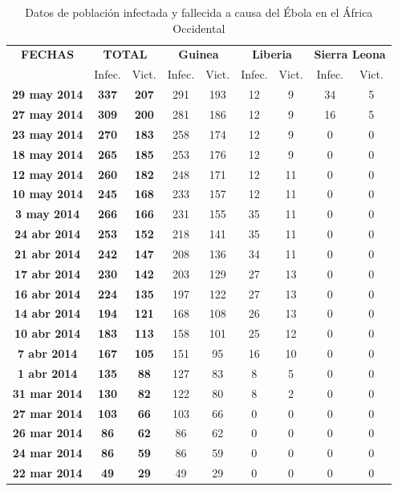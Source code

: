 \documentclass[a4paper,11pt]{article}
\numberwithin{equation}{section}
\begin{document}
\newpage
\begin{table}[H]
\centering
\begin{tabular}{c|cc|cc|cc|cc}
\toprule
\bf FECHAS & \multicolumn{2}{c}{\bf TOTAL}  & \multicolumn{2}{c}{\bf Guinea} & \multicolumn{2}{c}{\bf Liberia} & \multicolumn{2}{c}{\bf Sierra Leona}  \\ 
& Infec. & Vict. & Infec. & Vict. & Infec. & Vict. & Infec. & Vict. \\ \midrule
\bf 29 may 2014			&\bf 337		&\bf 207	&	291	&	193	&	12	&	9	&	34	&	5       \\
\bf 27 may 2014			&\bf 309		&\bf 200	&	281	&	186	&	12	&	9	&	16	&	5       \\
\bf 23 may 2014			&\bf 270		&\bf 183	&	258	&	174	&	12	&	9	&	0	&	0        \\
\bf 18 may 2014			&\bf 265		&\bf 185	&	253	&	176	&	12	&	9	&	0	&	0        \\
\bf 12 may 2014			&\bf 260		&\bf 182	&	248	&	171	&	12	&	11	&	0	&	0       \\
\bf 10 may 2014			&\bf 245		&\bf 168	&	233	&	157	&	12	&	11	&	0	&	0       \\
\bf 3 may 2014			&\bf 266		&\bf 166	&	231	&	155	&	35	&	11	&	0	&	0		\\
\bf 24 abr 2014			&\bf 253		&\bf 152	&	218	&	141	&	35	&	11	&	0	&	0	\\
\bf 21 abr 2014			&\bf 242		&\bf 147	&	208	&	136	&	34	&	11	&	0	&	0	\\
\bf 17 abr 2014			&\bf 230		&\bf 142	&	203	&	129	&	27	&	13	&	0	&	0	\\
\bf 16 abr 2014			&\bf 224		&\bf 135	&	197	&	122	&	27	&	13	&	0	&	0 \\
\bf 14 abr 2014			&\bf 194		&\bf 121	&	168	&	108	&	26	&	13	&	0	&	0 \\
\bf 10 abr 2014			&\bf 183		&\bf 113	&	158	&	101	&	25	&	12	&	0	&	0 \\
\bf 7 abr 2014			&\bf 167		&\bf 105	&	151	&	95	&	16	&	10	&	0	&	0   \\
\bf 1 abr 2014			&\bf 135		&\bf 88		&	127	&	83	&	8	&	5	&	0	&	0      \\
\bf 31 mar 2014			&\bf 130		&\bf 82		&	122	&	80	&	8	&	2	&	0	&	0     \\
\bf 27 mar 2014			&\bf 103		&\bf 66		&	103	&	66	&	0	&	0	&	0	&	0     \\
\bf 26 mar 2014			&\bf 86			&\bf 62		&	86	&	62	&	0	&	0	&	0	&	0      \\
\bf 24 mar 2014			&\bf 86			&\bf 59		&	86	&	59	&	0	&	0	&	0	&	0      \\
\bf 22 mar 2014			&\bf 49			&\bf 29		&	49	&	29	&	0	&	0	&	0	&	0	     \\
\end{tabular}
\caption{Datos de población infectada y fallecida a causa del Ébola en el África Occidental}
\end{table}
\end{document}
